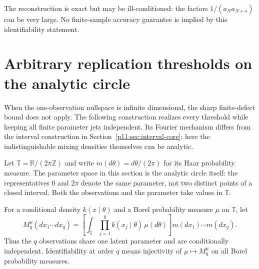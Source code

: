 \documentclass[11pt,letterpaper]{article}
\theoremstyle{definition}
\theoremstyle{remark}
\newcommand{\1}{\mathbf 1}
\begin{document}
The reconstruction is exact but may be ill-conditioned: the factors
$1/(a_Na_{N+s})$ can be very large.  No finite-sample accuracy guarantee is
implied by this identifiability statement.




\section{Arbitrary replication thresholds on the analytic circle}

When the one-observation nullspace is infinite dimensional, the sharp
finite-defect bound does not apply. The following construction realizes
every threshold while keeping all finite parameter jets independent.
Its Fourier mechanism differs from the interval construction in
Section~\ref{p11:sec:interval-core}: here the indistinguishable mixing
densities themselves can be analytic.
\label{p10:sec:replicate-hierarchy}

Let $\mathbb T=\mathbb R/(2\pi\mathbb Z)$ and write
$m(d\theta)=d\theta/(2\pi)$ for its Haar probability measure.
The parameter space in this section is the analytic circle itself: the
representatives $0$ and $2\pi$ denote the same parameter, not two distinct
points of a closed interval.  Both the observations and the parameter take
values in $\mathbb T$.

For a conditional density $k(x\mid\theta)$ and a Borel probability measure
$\mu$ on $\mathbb T$, let
\[
 M_q^\mu(dx_1\cdots dx_q)
 =\left[\int_{\mathbb T}\prod_{j=1}^q
          k(x_j\mid\theta)\,\mu(d\theta)\right]
       m(dx_1)\cdots m(dx_q).
\]
Thus the $q$ observations share one latent parameter and are conditionally
independent.  Identifiability at order $q$ means injectivity of
$\mu\mapsto M_q^\mu$ on all Borel probability measures.
\end{document}
